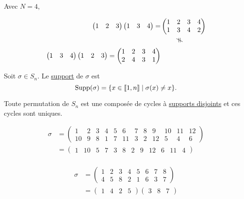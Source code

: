 \begin{exm}
	Avec $N=4$,
	
	\begin{align*}
		\begin{pmatrix}
			1&2&3
		\end{pmatrix} \begin{pmatrix}
			1&3&4
		\end{pmatrix} = &\begin{pmatrix}
			1&2&3&4\\
			1&3&4&2
		\end{pmatrix} \\
		&~~~~~~~\vrt{\neq}\\
		\begin{pmatrix}
			1&3&4
		\end{pmatrix} \begin{pmatrix}
			1&2&3
		\end{pmatrix} = \begin{pmatrix}
			1&2&3&4\\
			2&4&3&1
		\end{pmatrix} 
	\end{align*}
\end{exm}

\begin{defn}
	Soit $\sigma \in S_n$. Le \underline{support} de $\sigma$ est \[
		\operatorname{Supp}(\sigma) = \{x \in \left\llbracket 1,n \right\rrbracket  \mid  \sigma(x) \neq x\}. 
	\]
\end{defn}

\begin{thm}
	Toute permutation de $S_n$ est une composée de cycles à \underline{supports disjoints} et ces cycles sont uniques.
\end{thm}

\begin{exm}
	\begin{align*}
		\sigma &= \left(\begin{array}{cccccccccccc}
			1&2&3&4&5&6&7&8&9&10&11&12\\
			10&9&8&1&7&11&3&2&12&5&4&6
		\end{array}\right)\\
		&= \left(\begin{array}{cccccccccccc}
			1&10&5&7&3&8&2&9&12&6&11&4
		\end{array}\right) \\
	\end{align*}
\end{exm}

\begin{exm}
	\begin{align*}
		\sigma &= \begin{pmatrix}
			1&2&3&4&5&6&7&8\\
			4&5&8&2&1&6&3&7
		\end{pmatrix}\\
		&= \begin{pmatrix}
			1&4&2&5
		\end{pmatrix} \begin{pmatrix}
			3&8&7
		\end{pmatrix}\\
	\end{align*}
\end{exm}


